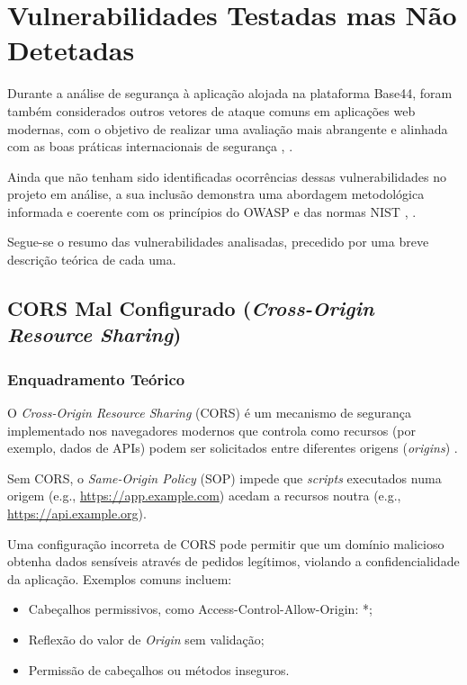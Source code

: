 \section{Vulnerabilidades Testadas mas Não Detetadas}

Durante a análise de segurança à aplicação alojada na plataforma Base44, foram também considerados outros vetores de ataque comuns em aplicações web modernas, com o objetivo de realizar uma avaliação mais abrangente e alinhada com as boas práticas internacionais de segurança \cite{ref1}, \cite{ref2}.

Ainda que não tenham sido identificadas ocorrências dessas vulnerabilidades no projeto em análise, a sua inclusão demonstra uma abordagem metodológica informada e coerente com os princípios do OWASP e das normas NIST \cite{ref3}, \cite{ref4}.

Segue-se o resumo das vulnerabilidades analisadas, precedido por uma breve descrição teórica de cada uma.

\subsection{CORS Mal Configurado (\textit{Cross-Origin Resource Sharing})}

\subsubsection{Enquadramento Teórico}

O \textit{Cross-Origin Resource Sharing} (CORS) é um mecanismo de segurança implementado nos navegadores modernos que controla como recursos (por exemplo, dados de APIs) podem ser solicitados entre diferentes origens (\textit{origins}) \cite{ref5}.

Sem CORS, o \textit{Same-Origin Policy} (SOP) impede que \textit{scripts} executados numa origem (e.g., \url{https://app.example.com}) acedam a recursos noutra (e.g., \url{https://api.example.org}).

Uma configuração incorreta de CORS pode permitir que um domínio malicioso obtenha dados sensíveis através de pedidos legítimos, violando a confidencialidade da aplicação. Exemplos comuns incluem:
\begin{itemize}

\item Cabeçalhos permissivos, como Access-Control-Allow-Origin: *;

\item Reflexão do valor de \textit{Origin} sem validação;

\item Permissão de cabeçalhos ou métodos inseguros.

\end{itemize}

